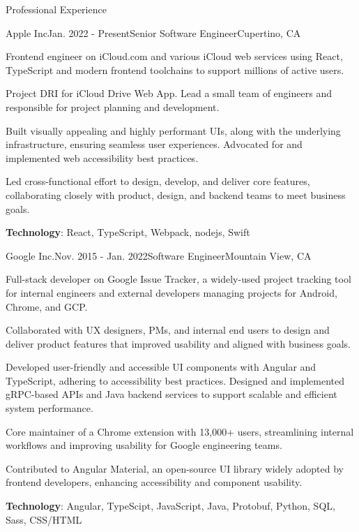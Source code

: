 \documentclass{resume} %
\begin{document}
\begin{rSection}{Professional Experience}

\begin{rSubsection}{Apple Inc}{Jan. 2022 - Present}{Senior Software Engineer}{Cupertino, CA}
\item Frontend engineer on iCloud.com and various iCloud web services using React, TypeScript and modern frontend toolchains to support millions of active users.
\item Project DRI for iCloud Drive Web App. Lead a small team of engineers and responsible for project planning and development.
\item Built visually appealing and highly performant UIs, along with the underlying infrastructure, ensuring seamless user experiences. Advocated for and implemented web accessibility best practices.
\item Led cross-functional effort to design, develop, and deliver core features, collaborating closely with product, design, and backend teams to meet business goals.
\item \textbf{Technology}: React, TypeScript, Webpack, nodejs, Swift
\end{rSubsection}


\begin{rSubsection}{Google Inc.}{Nov. 2015 - Jan. 2022}{Software Engineer}{Mountain View, CA}
\item Full-stack developer on Google Issue Tracker, a widely-used project tracking tool for internal engineers and external developers managing projects for Android, Chrome, and GCP.
\item Collaborated with UX designers, PMs, and internal end users to design and deliver product features that improved usability and aligned with business goals.
\item Developed user-friendly and accessible UI components with Angular and TypeScript, adhering to accessibility best practices. Designed and implemented gRPC-based APIs and Java backend services to support scalable and efficient system performance.
\item Core maintainer of a Chrome extension with 13,000+ users, streamlining internal workflows and improving usability for Google engineering teams.
\item Contributed to Angular Material, an open-source UI library widely adopted by frontend developers, enhancing accessibility and component usability.
\item \textbf{Technology}: Angular, TypeScipt, JavaScript, Java, Protobuf, Python, SQL, Sass, CSS/HTML


\end{rSubsection}
\end{rSection}
\end{document}
